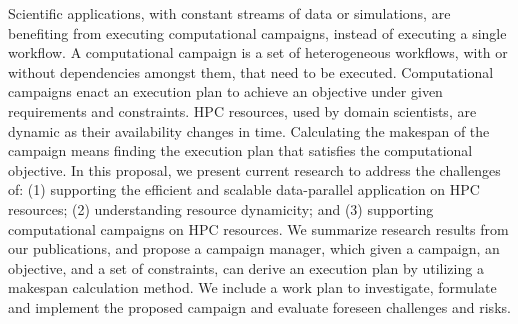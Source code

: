 Scientific applications, with constant streams of data or simulations, are benefiting from executing computational campaigns, instead of executing a single workflow.
A computational campaign is a set of heterogeneous workflows, with or without dependencies amongst them, that need to be executed.
Computational campaigns enact an execution plan to achieve an objective under given requirements and constraints.
HPC resources, used by domain scientists, are dynamic as their availability changes in time.
Calculating the makespan of the campaign means finding the execution plan that satisfies the computational objective.
In this proposal, we present current research to address the challenges of: (1) supporting the efficient and scalable data-parallel application on HPC resources; (2) understanding resource dynamicity; and (3) supporting computational campaigns on HPC resources.
We summarize research results from our publications, and propose a campaign manager, which given a campaign, an objective, and a set of constraints, can derive an execution plan by utilizing a makespan calculation method.
We include a work plan to investigate, formulate and implement the proposed campaign and evaluate foreseen challenges and risks.
